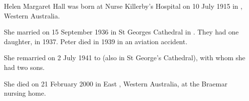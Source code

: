 
Helen Margaret Hall was born at Nurse Killerby's Hospital\cite{HMHbirthNotice} on 10 July 1915
in , Western Australia.\cite{HMHbirth}

She married  on 15 September 1936 in St Georges Cathedral in .\cite{MargPeterMarriage}
They had one daughter, in 1937.
Peter died in 1939 in an aviation accident.

She remarried on 2 July 1941\cite{MurrayMargMarriageNotice} to 
(also in St George's Cathedral\cite{MurrayMargMarriageNotice}), with whom she had two sons.

She died on 21 February 2000 in East , Western Australia, at the Braemar nursing home.
